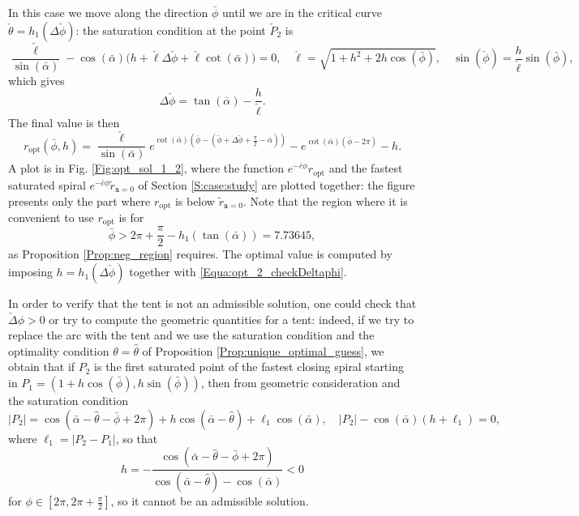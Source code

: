 \documentclass[reqno]{amsart}
\theoremstyle{definition} \newtheorem{definition}{Definition}[section]
\theoremstyle{definition} \newtheorem{remark}[definition]{Remark}
\theoremstyle{plain} \newtheorem{lemma}[definition]{Lemma}
\theoremstyle{plain} \newtheorem{proposition}[definition]{Proposition}
\theoremstyle{plain} \newtheorem{theorem}[definition]{Theorem}
\theoremstyle{plain} \newtheorem{corollary}[definition]{Corollary}
\theoremstyle{definition} \newtheorem{example}[definition]{Example}
\theoremstyle{plain} \newtheorem{claim}[clai]{Claim}
\theoremstyle{definition} \newtheorem{assumption}[definition]{Assumption}
\theoremstyle{definition} \newtheorem{observation}[definition]{Observation}
\newcommand{\1}{\mathbbm 1}
\numberwithin{equation}{section} %
\theoremstyle{plain} \newtheorem*{theorem*}{Theorem}
\theoremstyle{plain} \newtheorem{mthm}[maintheorem]{Main Theorem}
\theoremstyle{plain} \newtheorem*{mthm*}{Main Theorem}
\theoremstyle{plain} \newtheorem*{conjecture*}{Conjecture}
\theoremstyle{plain} \newtheorem{conjecture}[definition]{Conjecture}
\theoremstyle{plain} \newtheorem*{problem*}{Problem}
\begin{document}
In this case we move along the direction $\bar \phi$ until we are in the critical curve $\check \theta = h_1(\Delta \check \phi)$: the saturation condition at the point $\check P_2$ is
\begin{equation*}
\frac{\check \ell}{\sin(\bar \alpha)} - \cos(\bar \alpha) \big( h + \check \ell \Delta \check \phi + \check \ell \cot(\bar \alpha) \big) = 0, \quad \check \ell = \sqrt{1 + h^2 + 2 h \cos(\bar \phi)}, \quad \sin(\check \phi) = \frac{h}{\check \ell} \sin(\bar \phi),
\end{equation*}
which gives
\begin{equation}
\label{Equa:opt_2_checkDeltaphi}
\Delta \check \phi = \tan(\bar \alpha) - \frac{h}{\check \ell}.
\end{equation}
The final value is then
\begin{equation}
\label{Equa:ropt_2}
r_\mathrm{opt}(\bar \phi,h) = \frac{\check \ell}{\sin(\bar \alpha)} e^{\cot(\bar \alpha) (\bar \phi - (\check \phi + \Delta \check \phi + \frac{\pi}{2} - \bar \alpha))} - e^{\cot(\bar \alpha)(\bar \phi - 2\pi)} - h.
\end{equation}
A plot is in Fig. \ref{Fig:opt_sol_1_2}, where the function $e^{-\bar c \phi} r_\mathrm{opt}$ and the fastest saturated spiral $e^{-\bar c \phi} \tilde r_{\mathtt a = 0}$ of Section \ref{S:case:study} are plotted together: the figure presents only the part where $r_\mathrm{opt}$ is below $\tilde r_{\mathtt a = 0}$. Note that the region where it is convenient to use $r_\mathrm{opt}$ is for
$$
\bar \phi > 2\pi + \frac{\pi}{2} - h_1(\tan(\bar \alpha)) = 7.73645,
$$
as Proposition \ref{Prop:neg_region} requires. The optimal value is computed by imposing  $h = h_1(\Delta \check \phi)$ together with \eqref{Equa:opt_2_checkDeltaphi}.

In order to verify that the tent is not an admissible solution, one could check that $\check \Delta \phi > 0$ or try to compute the geometric quantities for a tent: indeed, if we try to replace the arc with the tent and we use the saturation condition and the optimality condition $\theta = \hat \theta$ of Proposition \ref{Prop:unique_optimal_guess}, we obtain that if $P_2$ is the first saturated point of the fastest closing spiral starting in $P_1 = (1 + h \cos(\bar \phi),h \sin(\bar \phi))$, then from geometric consideration and the saturation condition
\begin{equation*}
|P_2| = \cos(\bar \alpha - \hat \theta - \bar \phi + 2\pi) + h \cos(\bar \alpha - \hat \theta) + \ell_1 \cos(\bar \alpha), \quad |P_2| - \cos(\bar \alpha) (h + \ell_1) = 0,
\end{equation*}
where $\ell_1=|P_2-P_1|$, so that
\begin{equation*}
h = - \frac{\cos(\bar \alpha - \hat \theta - \bar \phi + 2\pi)}{\cos(\bar \alpha - \hat \theta) - \cos(\bar \alpha)} < 0
\end{equation*}
for $\phi \in [2\pi,2\pi + \frac{\pi}{2}]$, so it cannot be an admissible solution.
\end{document}
